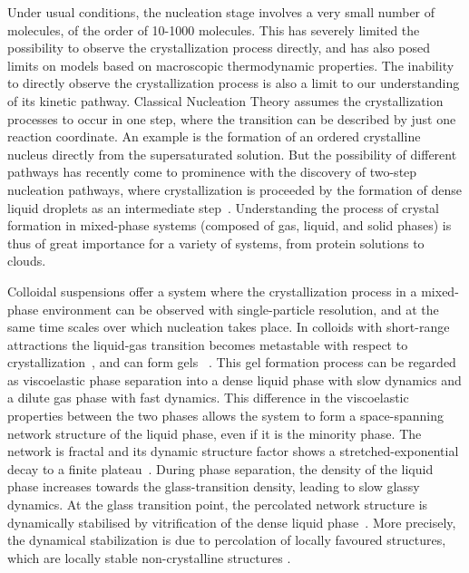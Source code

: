 \documentclass[preprint,amsmath,amssymb,superscriptaddress]{revtex4-1}
\begin{document}
Under usual conditions, the nucleation stage involves a very small number of molecules, of the order of 10-1000 molecules.
This has severely limited the possibility to observe the crystallization process directly, and has also posed limits on models based on macroscopic thermodynamic properties. 
The inability to directly observe the crystallization process is also a limit to our understanding of its kinetic pathway. 
Classical Nucleation Theory assumes the crystallization processes to occur in one step,
where the transition can be described by just one reaction coordinate. An example is the formation of an ordered crystalline nucleus
directly from the supersaturated solution. But the possibility of different pathways has recently come to prominence with
the discovery of two-step nucleation pathways, where crystallization is proceeded by the formation of dense liquid  droplets as an intermediate step~\cite{ten1997enhancement,SearR,savage2009experimental,vekilov2010two,palberg2014crystallization}.
Understanding the process of crystal formation in mixed-phase systems (composed of gas, liquid, and solid phases) is thus
of great importance for a variety of systems, from protein solutions to clouds. 

Colloidal suspensions offer a system where the crystallization process in a mixed-phase environment can be observed with single-particle
resolution, and at the same time scales over which nucleation takes place. In colloids with short-range attractions the liquid-gas transition 
becomes metastable with respect to crystallization~\cite{anderson2002insights,lekkerkerker2011colloids}, and can form gels   
~\cite{poon2002,zaccarelli2007,piazza1994phase,verhaegh1997transient,lu2008gelation}. 
This gel formation process can be regarded as viscoelastic phase separation  \cite{tanaka1999colloid,tanaka2000viscoelastic} into a dense liquid phase with slow dynamics and a dilute gas phase with fast dynamics.  
This difference in the viscoelastic properties between the two phases allows the system to form a space-spanning 
network structure of the liquid phase, even if it is the minority phase. The network is fractal and its dynamic structure factor shows a stretched-exponential decay to a finite
plateau~\cite{krall1998internal,solomon2001dynamic,romer2000sol}. 
During phase separation, the density of the liquid phase increases towards the glass-transition density, leading to slow glassy dynamics.
At the glass transition point, the percolated network structure is dynamically stabilised by vitrification 
of the dense liquid phase~\cite{pusey1993dynamics,piazza1994phase,ilett1995phase,verhaegh1997transient,tanaka1999colloid,foffi2002,buzzaccaro2007sticky,zaccarelli2007,lu2008gelation,zaccarelli2008gelation,testard2011}.  
More precisely, the dynamical stabilization is due to percolation of locally favoured structures, which are locally stable non-crystalline structures \cite{royall2008g}.
\end{document}
